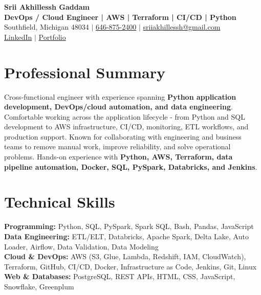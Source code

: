\documentclass[letterpaper,10pt]{article}
\begin{document}
\fontsize{9.35pt}{10.45pt}\selectfont

\begin{center}
    {\LARGE \textbf{Srii Akhillessh Gaddam}} \\[-1pt]
    \textbf{DevOps / Cloud Engineer | AWS | Terraform | CI/CD | Python} \\[2pt]
    Southfield, Michigan 48034 $|$
    \href{tel:6468752400}{646-875-2400} $|$
    \href{mailto:sriiakhillessh@gmail.com}{sriiakhillessh@gmail.com} \\[1pt]
    \href{https://www.linkedin.com/in/srii-akhiilessh-gaddam-b48668191/}{LinkedIn} $|$
    \href{https://sriiakhillesshg.github.io/portfolio/}{Portfolio}
\end{center}
\vspace{-8pt}

\section{Professional Summary}
\small{Cross-functional engineer with experience spanning \textbf{Python application development, DevOps/cloud automation, and data engineering}. Comfortable working across the application lifecycle - from Python and SQL development to AWS infrastructure, CI/CD, monitoring, ETL workflows, and production support. Known for collaborating with engineering and business teams to remove manual work, improve reliability, and solve operational problems. Hands-on experience with \textbf{Python, AWS, Terraform, data pipeline automation, Docker, SQL, PySpark, Databricks, and Jenkins}.}

\section{Technical Skills}
\small{
\textbf{Programming:} Python, SQL, PySpark, Spark SQL, Bash, Pandas, JavaScript \\
\textbf{Data Engineering:} ETL/ELT, Databricks, Apache Spark, Delta Lake, Auto Loader, Airflow, Data Validation, Data Modeling \\
\textbf{Cloud \& DevOps:} AWS (S3, Glue, Lambda, Redshift, IAM, CloudWatch), Terraform, GitHub, CI/CD, Docker, Infrastructure as Code, Jenkins, Git, Linux \\
\textbf{Web \& Databases:} PostgreSQL, REST APIs, HTML, CSS, JavaScript, Snowflake, Greenplum
}
\end{document}
